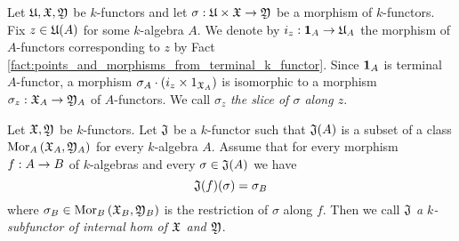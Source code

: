 \begin{definition}
Let ${\mathfrak U},{\mathfrak X},{\mathfrak Y}$ be $k$-functors and let $\sigma:{\mathfrak U}\times {\mathfrak X}\rightarrow {\mathfrak Y}$ be a morphism of $k$-functors. Fix $z\in {\mathfrak U}(A)$ for some $k$-algebra $A$. We denote by $i_z:\mathbf{1}_A\rightarrow {\mathfrak U}_A$ the morphism of $A$-functors corresponding to $z$ by Fact \ref{fact:points_and_morphisms_from_terminal_k_functor}. Since $\mathbf{1}_A$ is terminal $A$-functor, a morphism $\sigma_A\cdot \left(i_z\times 1_{{\mathfrak X}_A}\right)$ is isomorphic to a morphism $\sigma_z:{\mathfrak X}_A\rightarrow {\mathfrak Y}_A$ of $A$-functors. We call $\sigma_z$ \textit{the slice of $\sigma$ along $z$}.
\end{definition}

\begin{definition}
Let ${\mathfrak X}, {\mathfrak Y}$ be $k$-functors. Let ${\mathfrak J}$ be a $k$-functor such that ${\mathfrak J}(A)$ is a subset of a class $\mathrm{Mor}_A\left({\mathfrak X}_A,{\mathfrak Y}_A\right)$ for every $k$-algebra $A$. Assume that for every morphism $f:A\rightarrow B$ of $k$-algebras and every $\sigma\in {\mathfrak J}(A)$ we have
$${\mathfrak J}(f)(\sigma) = \sigma_B$$
where $\sigma_B\in \mathrm{Mor}_B\left({\mathfrak X}_B,{\mathfrak Y}_B\right)$ is the restriction of $\sigma$ along $f$. Then we call ${\mathfrak J}$ \textit{a $k$-subfunctor of internal hom of ${\mathfrak X}$ and ${\mathfrak Y}$}.
\end{definition}

